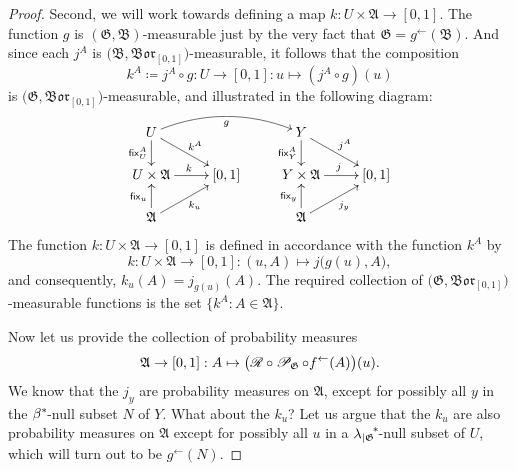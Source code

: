 \documentclass[
twoside=true,
paper=letter,
fontsize=11pt,
pagesize=auto,
leqno,
openany,
headsepline,
overfullrule,
]{scrbook}
\theoremstyle{plain}
\theoremstyle{plain}
\theoremstyle{definition}
\theoremstyle{bfnoteitalic}
\theoremstyle{bfnoteroman}
\newcommand{\sigalg}[1]{\mathfrak{#1}}
\newcommand{\cali}[1]{\mathscr{#1}}
\newcommand{\definedby}{\coloneqq}
\newcommand{\sfop}[1]{\mathsf{#1}}
\newcommand{\condprobop}[1]{\mathop{\cali{P}\hspace{-1pt}}\nolimits_{#1}}
\newcommand{\borel}{\mathfrak{Bor}}
\newcommand{\restrictedto}[1]{_{\lvert#1}\kern-1.5pt}
\newcommand{\preimage}[1]{#1^{\leftarrow}}
\newcommand{\sigmaalgebra}{\sigalg{A}}
\newcommand{\sigmaalgebraii}{\sigalg{B}}
\newcommand{\kernast}{\ast\kern-1pt}
\newcommand{\funcg}{g}
\newcommand{\funck}{k}
\newcommand{\funcj}{j}
\newcommand{\function}{f}
\newcommand{\measurespaceii}{Y}
\newcommand{\mspaceeltii}{y}
\newcommand{\measlambda}{\lambda}
\newcommand{\seti}{A}
\newcommand{\regular}{\cali{R}}
\newcommand{\fixinthefirst}[1]{\sfop{fix}_{#1}}
\newcommand{\fixinthesecond}[1]{\sfop{fix}^{#1}}
\newcommand{\uspace}{U}%
\newcommand{\uspaceelt}{u}
\newcommand{\marginaltwo}{\beta}%
\begin{document}
\begin{proof}
Second, we will work towards defining a map
$\funck: \uspace\times \sigmaalgebra \to [0,1]$.
The function $\funcg$ is
$(\sigalg{G},\sigmaalgebraii)$\hyp{}measurable just by the very fact that
$\sigalg{G} = \preimage{\funcg}(\sigmaalgebraii)$. And since each
$\funcj^\seti$ is
$\bigl( \sigmaalgebraii, \borel_{[0,1]} \bigr)$\hyp{}measurable, it follows that the composition
\[
\funck^\seti\definedby\funcj^\seti\circ\funcg
: \uspace \to [0,1]
:\uspaceelt \mapsto (\funcj^\seti\circ\funcg)(\uspaceelt)
\]
is
$\bigl( \sigalg{G}, \borel_{[0,1]} \bigr)$\hyp{}measurable, and illustrated in the following diagram:
\[%
\xymatrix@R=16pt@C=24pt{
\uspace \ar[d]_-{\fixinthesecond{\seti}_\uspace} \ar@/^12pt/[rr]_{\funcg}
\ar[dr]^{\funck^\seti}
&
& \measurespaceii \ar[d]_-{\fixinthesecond{\seti}_\measurespaceii}
\ar[dr]^{\funcj^\seti}
&
\\
\uspace\times\sigmaalgebra \ar[r]^{\funck}
& [0,1]
& \measurespaceii\times\sigmaalgebra \ar[r]^{\funcj}
& [0,1]
\\
\sigmaalgebra \ar[u]^{\fixinthefirst{\uspaceelt}}
\ar[ur]_{\funck_\uspaceelt}
&
& \sigmaalgebra \ar[u]^{\fixinthefirst{\mspaceeltii}}
\ar[ur]_{\funcj_\mspaceeltii}
&
\\
}
\]
The function
$\funck: \uspace\times \sigmaalgebra \to [0,1]$
is defined in accordance with the function $\funck^\seti$ by
\[
\funck: \uspace\times \sigmaalgebra \to [0,1] :
(\uspaceelt,\seti) \mapsto \funcj\bigl(\funcg(\uspaceelt),\seti\bigr),
\]
and consequently,
$\funck_\uspaceelt(\seti)=\funcj_{\funcg(\uspaceelt)}(\seti)$.
The required collection of $\bigl( \sigalg{G}, \borel_{[0,1]} \bigr)$\hyp{}measurable
functions is the set $\{\funck^\seti : \seti\in\sigmaalgebra\}$.

Now let us provide the collection of probability measures
\[
\sigmaalgebra\to [0,1]: \seti \mapsto
\bigl( \regular\circ\condprobop{\sigalg{G}} \circ\preimage{\function}
(\seti)\bigr)(\uspaceelt).
\]
We know that the $\funcj_\mspaceeltii$ are probability measures on $\sigmaalgebra$, except for possibly all
$\mspaceeltii$ in the $\marginaltwo^\kernast$\hyp{}null subset $N$ of $\measurespaceii$.  What about the
$\funck_\uspaceelt$?  Let us argue that the $\funck_\uspaceelt$ are also probability measures on $\sigmaalgebra$ except for possibly all $\uspaceelt$ in a
${\measlambda\restrictedto{\sigalg{G}}}^\kernast$\hyp{}null subset of $\uspace$,
which will turn out to be $\preimage{\funcg}(N)$.


\end{proof}
\end{document}
